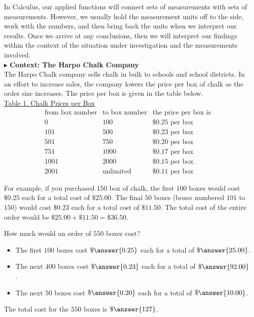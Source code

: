 \documentclass{ximera}
\begin{document}
In Calculus, our applied functions will connect sets of measurements with sets of measurements. However, we usually hold the measurement units off to the side, work with the numbers, and then bring back the units when we interpret our results.  Once we arrive at any conclusions, then we will interpret our findings within the context of the situation under investigation and the measurements involved. \\




$\blacktriangleright$ \textbf{Context: The Harpo Chalk Company} \\

The Harpo Chalk company sells chalk in bulk to schools and school districts. In an effort to increase sales, the company lowers the price per box of chalk as the order size increases.  The price per box is given in the table below. \\




\underline{Table 1. Chalk Prices per Box}
\[
\begin{array}{lll}
\text{from box number} & \text{to box number}  & \text{the price per box is} \\
0 &  100 &  \$0.25 \text{ per box}   \\
101 &  500 &  \$0.23 \text{ per box}   \\
501 &  750 &  \$0.20 \text{ per box}   \\
751 &  1000 &  \$0.17 \text{ per box}   \\
1001 &  2000 &  \$0.15 \text{ per box}   \\
2001 &  \text{unlimited} &  \$0.11 \text{ per box}   
\end{array}
\]




For example, if you purchased $150$ box of chalk, the first $100$ boxes would cost $\$0.25$ each for a total cost of $\$25.00$.  The final $50$ boxes (boxes numbered $101$ to $150$) would cost $\$0.23$ each for a total cost of $\$11.50$.  The total cost of the entire order would be $\$25.00 + \$11.50 = \$36.50$.


\begin{question}
How much would an order of $550$ boxes cost?

\begin{explanation}

\begin{itemize}
\item The first $100$ boxes cost $\$\answer{0.25}$ each for a total of $\$\answer{25.00}$.
\item The next $400$ boxes cost $\$\answer{0.23}$ each for a total of $\$\answer{92.00}$.
\item The next $50$ boxes cost $\$\answer{0.20}$ each for a total of $\$\answer{10.00}$.
\end{itemize}

The total cost for the $550$ boxes is $\$\answer{127}$.
\end{explanation}
\end{question}
\end{document}
